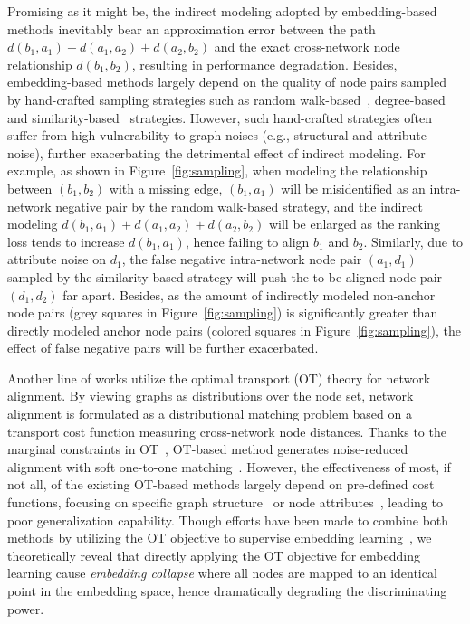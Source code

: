 Promising as it might be, the indirect modeling adopted by embedding-based methods inevitably bear an approximation error between the path $d(b_1, a_1) + d(a_1, a_2) + d(a_2, b_2)$ and the exact cross-network node relationship $d(b_1,b_2)$, resulting in performance degradation.
Besides, embedding-based methods largely depend on the quality of node pairs sampled by hand-crafted sampling strategies such as random walk-based~\cite{dlna}, degree-based~\cite{crossmna, ione} and similarity-based~\cite{bright, nextalign} strategies. However, such hand-crafted strategies often suffer from high vulnerability to graph noises (e.g., structural and attribute noise), further exacerbating the detrimental effect of indirect modeling.
For example, as shown in Figure~\ref{fig:sampling}, when modeling the relationship between $(b_1,b_2)$ with a missing edge, $(b_1,a_1)$ will be misidentified as an intra-network negative pair by the random walk-based strategy, and the indirect modeling $d(b_1, a_1) + d(a_1, a_2) + d(a_2, b_2)$ will be enlarged as the ranking loss tends to increase $d(b_1,a_1)$, hence failing to align $b_1$ and $b_2$.
Similarly, due to attribute noise on $d_1$, the false negative intra-network node pair $(a_1,d_1)$ sampled by the similarity-based strategy will push the to-be-aligned node pair $(d_1,d_2)$ far apart. Besides, as the amount of indirectly modeled non-anchor node pairs (grey squares in Figure~\ref{fig:sampling}) is significantly greater than directly modeled anchor node pairs (colored squares in Figure~\ref{fig:sampling}), the effect of false negative pairs will be further exacerbated. 

Another line of works utilize the optimal transport (OT) theory for network alignment.
By viewing graphs as distributions over the node set, network alignment is formulated as a distributional matching problem based on a transport cost function measuring cross-network node distances.
Thanks to the marginal constraints in OT~\cite{peyre2019computational}, OT-based method generates noise-reduced alignment with soft one-to-one matching~\cite{parrot}.
However, the effectiveness of most, if not all, of the existing OT-based methods largely depend on pre-defined cost functions, focusing on specific graph structure~\cite{got, walign, fgot, zeng2024hierarchical} or node attributes~\cite{got2,parrot}, leading to poor generalization capability. Though efforts have been made to combine both methods by utilizing the OT objective to supervise embedding learning~\cite{slotalign,gwl,s-gwl,got2,combalign}, we theoretically reveal that directly applying the OT objective for embedding learning cause {\em embedding collapse} where all nodes are mapped to an identical point in the embedding space, hence dramatically degrading the discriminating power.

